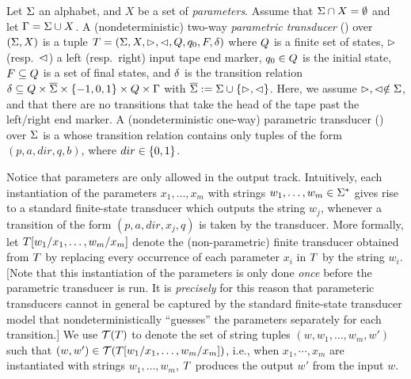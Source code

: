 \begin{definition}
    Let $\Sigma$ an alphabet, and $X$ be a set of \emph{parameters}. 
    Assume that $\Sigma \cap X = \emptyset$ and let $\Gamma = 
    \Sigma \cup X$.
    A (nondeterministic) two-way \emph{parametric transducer} (\PPT) over 
    $(\Sigma,X)$ is a tuple $T =
(\Sigma, X, \vartriangleright, \vartriangleleft, Q, q_0, F, \delta)$ where 
    $Q$ is a finite set of 
    states, $\vartriangleright$ (resp.~$\vartriangleleft$) a left (resp.~right) input tape end 
    marker, $q_0\in Q$ is
the initial state, $F\subseteq Q$ is a set of final states, and 
    $\delta$ is the
transition relation  $\delta\subseteq Q \times 
    \overline{\Sigma}\times \{-1, 0, 1\}\times 
    Q \times \Gamma$ with
    $\overline{\Sigma} := \Sigma \cup \{\vartriangleright,\vartriangleleft\}$.
    Here, we assume $\vartriangleright, \vartriangleleft \notin \Sigma$, and that
    there are no transitions that take the head of the tape past the left/right
    end marker. 
    A (nondeterministic one-way) parametric transducer (\PT) over
    $\Sigma$
    is a \PPT{} whose transition relation contains only tuples of the form
    $(p,a,dir,q,b)$, where $dir \in \{0,1\}$.
\end{definition}

Notice that parameters are only allowed in the output track.
Intuitively, each instantiation of the parameters $x_1,\ldots,x_m$ with strings 
$w_1,\ldots, w_m \in \Sigma^*$ gives rise to a standard finite-state transducer which outputs
the string $w_j$, whenever a transition of the form $(p, a, dir, x_j, q)$ is
taken by the transducer. More formally, let 
$T[w_1/x_1,\ldots,w_m/x_m]$ denote the (non-parametric) finite
transducer obtained from $T$ by replacing every occurrence of each
parameter $x_i$ in $T$ by the string $w_i$.
[Note that this instantiation of the parameters is only done 
\emph{once} before the parametric transducer is run. It is \emph{precisely}
for this reason that parameteric transducers cannot in general be captured by 
the standard finite-state transducer model that nondeterministically ``guesses''
the parameters separately for each transition.]  
We use $\mathcal{T}(T)$ to denote the set of string tuples 
$(w, w_1, \ldots, w_m, w')$ such that 
$(w,w') \in \mathcal{T}(T[w_1/x_1,\ldots,w_m/x_m])$, i.e., when
$x_1,\cdots, x_m$ are instantiated with strings $w_1,\ldots, w_m$, 
$T$ produces the output $w'$ from the input $w$. 

